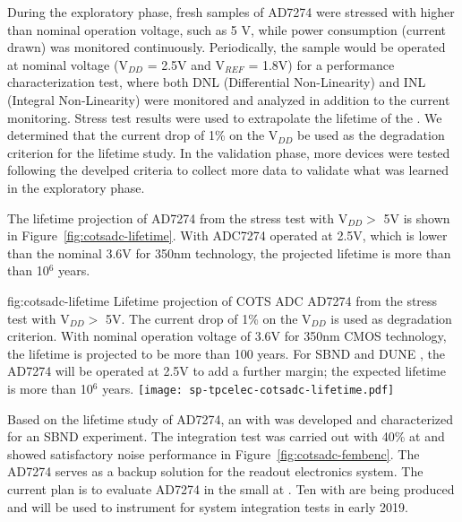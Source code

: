 During the exploratory phase, fresh samples of   AD7274 were stressed with higher than nominal operation voltage, such as 5 V, while power consumption (current drawn) was monitored continuously. Periodically, the sample would be operated at nominal voltage (V$_{DD}$ = 2.5V and V$_{REF}$ = 1.8V) for a performance characterization test, where both DNL (Differential Non-Linearity) and INL (Integral Non-Linearity)  were monitored and analyzed in addition to the current monitoring. Stress test results were used to extrapolate the lifetime of the  . We determined that the current drop of 1\% on the V$_{DD}$ be used as the degradation criterion for the lifetime study. In the validation phase, more devices were tested following the develped criteria to collect more data to validate what was learned in the exploratory phase.

The lifetime projection of   AD7274 from the stress test with V$_{DD} >$ 5V is shown in Figure~\ref{fig:cotsadc-lifetime}. With ADC7274 operated at 2.5V, which is lower than the nominal 3.6V for 350nm  technology, the projected lifetime is more than than 10$^6$ years.

\begin{dunefigure}
{fig:cotsadc-lifetime}
	{Lifetime projection of COTS ADC AD7274 from the stress test with V$_{DD} >$ 5V. The current drop of 1\% on the V$_{DD}$ is used as degradation criterion. With nominal operation voltage of 3.6V for 350nm CMOS technology, the lifetime is projected to be more than 100 years. For SBND and DUNE , the AD7274 will be operated at 2.5V to add a further margin; the expected lifetime is more than 10$^6$ years.}
\texttt{[image: sp-tpcelec-cotsadc-lifetime.pdf]}
\end{dunefigure}

Based on the lifetime study of AD7274, an  with   was developed and characterized for an SBND experiment. The integration test was carried out with 40\%  at  and showed satisfactory noise performance in Figure~\ref{fig:cotsadc-fembenc}. The   AD7274 serves as a backup solution for the    readout electronics system. The current plan is to evaluate AD7274  in the small   at . Ten  with   are being produced and will be used to instrument   for system integration tests in early 2019. 

